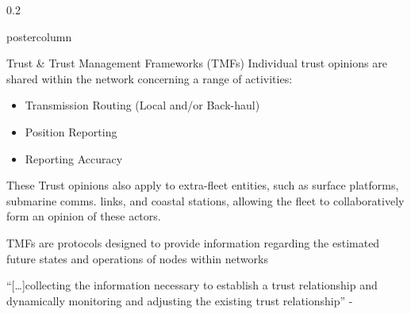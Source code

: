 \documentclass[final,hyperref={pdfpagelabels=false}]{beamer}
\def\colwidth{0.2\linewidth}
\begin{document}
\begin{frame}[fragile]
\begin{columns}[T]
\begin{column}{\colwidth}
\begin{beamercolorbox}[center,wd=\textwidth]{postercolumn}
\begin{minipage}[T]{.99\textwidth}
{\begin{block}{Trust \& Trust Management Frameworks (TMFs)}
							Individual trust opinions are shared within the network concerning a range of activities:
							\begin{itemize}
								\item Transmission Routing (Local and/or Back-haul)
								\item Position Reporting
								\item Reporting Accuracy
							\end{itemize}
							\vspace{0.25\baselineskip}
														
							These Trust opinions also apply to extra-fleet entities, such as surface platforms, submarine comms. links, and coastal stations, allowing the fleet to collaboratively form an opinion of these actors.
							
							TMFs are protocols designed to provide information regarding the estimated future states and operations of nodes within networks
							\vspace{0.25\baselineskip}
														
							``[\ldots]collecting the information necessary to establish a trust relationship and dynamically monitoring and adjusting the existing trust relationship'' - \cite{Li2007}
														

\end{block}}
\end{minipage}
\end{beamercolorbox}
\end{column}
\end{columns}
\end{frame}
\end{document}
